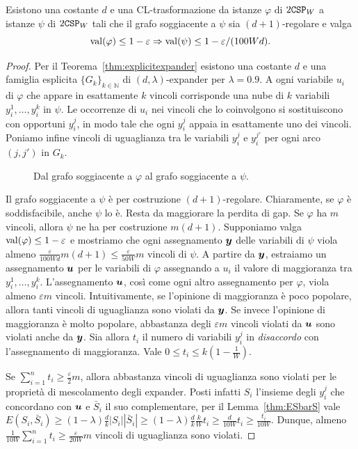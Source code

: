 \begin{lemma}
	Esistono una costante $d$ e una CL-trasformazione da istanze $\varphi$ di
	$2\mathtt{CSP}_W$ a istanze $\psi$ di $2\mathtt{CSP}_W$ tali che il grafo soggiacente a
	$\psi$ sia $(d + 1)$-regolare e valga
	\[
		\operatorname{val}(\varphi) \le 1 - \varepsilon \Rightarrow \operatorname{val}(\psi)
			\le 1 - \varepsilon / (100 W d).
	\]
\end{lemma}
\begin{proof}
	Per il Teorema~\ref{thm:explicitexpander} esistono una costante $d$ e una
	famiglia esplicita $\{G_k\}_{k \in \mathbb{N}}$ di $(d, \lambda)$-expander
	per $\lambda = 0.9$.
	A ogni variabile $u_i$ di $\varphi$ che appare in esattamente $k$ vincoli
	corrisponde una nube di $k$ variabili $y_i^1, \dots, y_i^k$ in $\psi$.
	Le occorrenze di $u_i$ nei vincoli che lo coinvolgono si sostituiscono con
	opportuni $y_i^j$, in modo tale che ogni $y_i^j$ appaia in esattamente uno
	dei vincoli. Poniamo infine vincoli di uguaglianza tra le variabili
	$y_i^j$ e $y_i^{j'}$ per ogni arco $(j, j')$ in $G_k$.

	\begin{figure}[htbp]
		\centering
		
		\caption{Dal grafo soggiacente a $\varphi$ al grafo soggiacente a $\psi$.}
		\label{fig:d-regular-instance}
	\end{figure}

	Il grafo soggiacente a $\psi$ è per costruzione $(d + 1)$-regolare.
	Chiaramente, se $\varphi$ è soddisfacibile, anche $\psi$ lo è.
	Resta da maggiorare la perdita di gap.
	Se $\varphi$ ha $m$ vincoli, allora $\psi$ ne ha per costruzione $m(d + 1)$.
	Supponiamo valga $\operatorname{val}(\varphi) \le 1 - \varepsilon$ e mostriamo che ogni
	assegnamento $\bm{y}$ delle variabili di $\psi$ viola almeno
	$\frac{\varepsilon}{100 W d} m (d + 1) \le \frac{\varepsilon}{50 W} m$ vincoli
	di $\psi$. A partire da $\bm{y}$, estraiamo un assegnamento
	$\bm{u}$ per le variabili di $\varphi$ assegnando a $u_i$ il valore di
	maggioranza tra $y_i^1, \dots, y_i^k$.
	L'assegnamento $\bm{u}$, così come ogni altro assegnamento per $\varphi$,
	viola almeno $\varepsilon m$ vincoli.
	Intuitivamente, se l'opinione di maggioranza è poco popolare, allora tanti
	vincoli di uguaglianza sono violati da $\bm{y}$. Se invece l'opinione di
	maggioranza è molto popolare, abbastanza degli $\varepsilon m$ vincoli
	violati da $\bm{u}$ sono violati anche da $\bm{y}$.
	Sia allora $t_i$ il numero di variabili $y_i^j$ in \emph{disaccordo} con
	l'assegnamento di maggioranza. Vale $0 \le t_i \le k(1 - \frac1{W})$.
	
	Se $\sum_{i=1}^n t_i \ge \frac{\varepsilon}{2} m$, allora abbastanza vincoli
	di uguaglianza sono violati per le proprietà di mescolamento degli expander.
	Posti infatti $S_i$ l'insieme degli $y_i^j$ che concordano con
	$\bm{u}$ e $\bar{S}_i$ il suo complementare, per il Lemma~\ref{thm:ESbarS}
	vale $E(S_i, \bar{S}_i) \ge (1 - \lambda) \frac{d}{k} |S_i| |\bar{S}_i|
	\ge (1 - \lambda)\frac{d}{k} \frac{k}{W} t_i \ge \frac{d}{10 W}t_i
	\ge \frac{t_i}{10 W}$. Dunque, almeno $\frac1{10 W} \sum_{i = 1}^n t_i
	\ge \frac{\varepsilon}{20 W} m$ vincoli di uguaglianza sono violati.


\end{proof}
